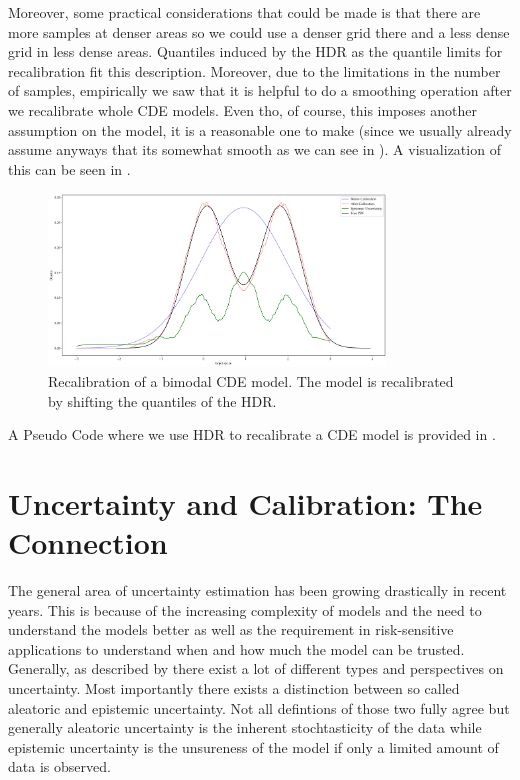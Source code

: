 Moreover, some practical considerations that could be made is that there are more samples at denser areas so we could use a denser grid there and a less dense grid in less dense areas. Quantiles induced by the HDR as the quantile limits for recalibration fit this description. Moreover, due to the limitations in the number of samples, empirically we saw that it is helpful to do a smoothing operation after we recalibrate whole CDE models. Even tho, of course, this imposes another assumption on the model, it is a reasonable one to make (since we usually already assume anyways that its somewhat smooth as we can see in ). A visualization of this can be seen in .

\begin{figure}
    \centering
    \includegraphics[width=0.8\textwidth]{resources/recalibration_bimodal_cde.png}
    \caption{Recalibration of a bimodal CDE model. The model is recalibrated by shifting the quantiles of the HDR.}
    \label{fig:recalibration}
\end{figure}

A Pseudo Code where we use HDR to recalibrate a CDE model is provided in .

\section{Uncertainty and Calibration: The Connection}\label{sec:uncertainty_calibration}

The general area of uncertainty estimation has been growing drastically in recent years. This is because of the increasing complexity of models and the need to understand the models better as well as the requirement in risk-sensitive applications to understand when and how much the model can be trusted. Generally, as described by \cite{hullermeier_aleatoric_2021} there exist a lot of different types and perspectives on uncertainty. Most importantly there exists a distinction between so called aleatoric and epistemic uncertainty. Not all defintions of those two fully agree but generally aleatoric uncertainty is the inherent stochtasticity of the data while epistemic uncertainty is the unsureness of the model if only a limited amount of data is observed.

